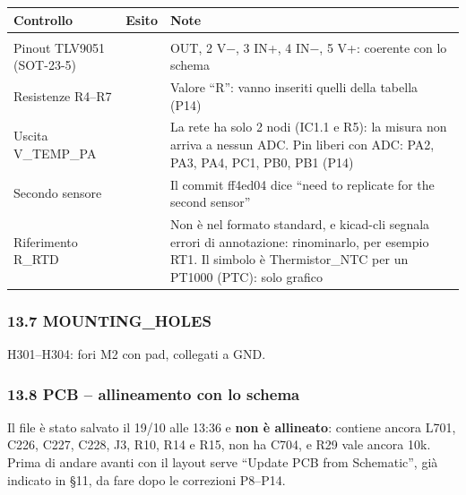 {\small{}\setlength{\tabcolsep}{4pt}\renewcommand{\arraystretch}{1.1}
\begin{xltabular}{\linewidth}{>{\hsize\raggedright\arraybackslash}X>{\hsize\raggedright\arraybackslash}X>{\hsize\raggedright\arraybackslash}X}
\toprule
\textbf{Controllo} & \textbf{Esito} & \textbf{Note} \\
\midrule
\endhead
\midrule[0.15pt]\\\bottomrule\endfoot
\bottomrule\endlastfoot
Pinout TLV9051 (SOT-23-5) &  & 1 OUT, 2 V−, 3 IN+, 4 IN−, 5 V+: coerente con lo schema \\\midrule[0.15pt]
Resistenze R4–R7 &  & Valore \textquotedblleft{}R\textquotedblright{}: vanno inseriti quelli della tabella (P14) \\\midrule[0.15pt]
Uscita V\_\allowbreak{}TEMP\_\allowbreak{}PA &  & La rete ha solo 2 nodi (IC1.1 e R5): la misura non arriva a nessun ADC. Pin liberi con ADC: PA2, PA3, PA4, PC1, PB0, PB1 (P14) \\\midrule[0.15pt]
Secondo sensore &  & Il commit ff4ed04 dice \textquotedblleft{}need to replicate for the second sensor\textquotedblright{} \\\midrule[0.15pt]
Riferimento R\_\allowbreak{}RTD &  & Non è nel formato standard, e kicad-cli segnala errori di annotazione: rinominarlo, per esempio RT1. Il simbolo è Thermistor\_\allowbreak{}NTC per un PT1000 (PTC): solo grafico \\
\end{xltabular}}

\subsubsection[13.7 MOUNTING\_\allowbreak{}HOLES]{13.7 MOUNTING\_\allowbreak{}HOLES}

H301–H304: fori M2 con pad, collegati a GND. 

\subsubsection[13.8 PCB – allineamento con lo schema]{13.8 PCB – allineamento con lo schema}

Il file  è stato salvato il 19/\allowbreak{}10 alle 13:36 e \textbf{non è allineato}: contiene ancora L701, C226, C227, C228, J3, R10, R14 e R15, non ha C704, e R29 vale ancora 10k. Prima di andare avanti con il layout serve \textquotedblleft{}Update PCB from Schematic\textquotedblright{}, già indicato in §11, da fare dopo le correzioni P8–P14.

